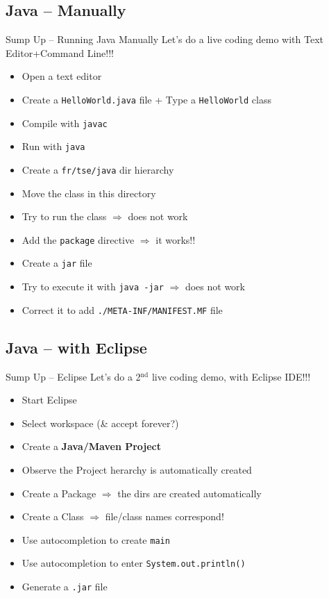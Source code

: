 \documentclass[English,c,%
hyperref={%
    pdftitle={FISA-DE2 OOP in Java},%
    pdfauthor={Muller, Gravier, Laforest, Subercaze},%
    pdfsubject={OOP in Java},%
    pdfkeywords={OOP, Java},%
    colorlinks=true,%
    urlcolor=blue,%
    linkcolor=%
    },%
xcolor={pdftex,svgnames} %
]{beamer}
\begin{document}
\subsection{Java -- Manually}

\begin{frame}{Sump Up -- Running Java Manually}
Let's do a live coding demo with Text Editor+Command Line!!!
\begin{itemize}
  \item Open a text editor
  \item Create a \texttt{HelloWorld.java} file + Type a \texttt{HelloWorld} class
  \item Compile with \texttt{javac}
  \item Run with \texttt{java}
  \medskip
  \item Create a \texttt{fr/tse/java} dir hierarchy
  \item Move the class in this directory
  \item Try to run the class $\Rightarrow$ does not work
  \item Add the \texttt{package} directive $\Rightarrow$ it works!!
  \medskip
  \item Create a \texttt{jar} file
  \item Try to execute it with \texttt{java -jar} $\Rightarrow$ does not work
  \item Correct it to add \texttt{./META-INF/MANIFEST.MF} file
\end{itemize}
\end{frame}

\subsection{Java -- with Eclipse}
\begin{frame}{Sump Up -- Eclipse}
Let's do a 2$^{\text{nd}}$ live coding demo, with Eclipse IDE!!!
\begin{itemize}
  \item Start Eclipse
  \item Select workspace (\& accept forever?)
  \item Create a \textbf{Java/Maven Project}
  \item Observe the Project herarchy is automatically created
  \medskip
  \item Create a Package $\Rightarrow$ the dirs are created automatically
  \item Create a Class $\Rightarrow$ file/class names correspond!
  \medskip
  \item Use autocompletion to create \lstinline{main}
  \item Use autocompletion to enter \lstinline{System.out.println()}
  \medskip
  \item Generate a \texttt{.jar} file
\end{itemize}
\end{frame}
\end{document}
